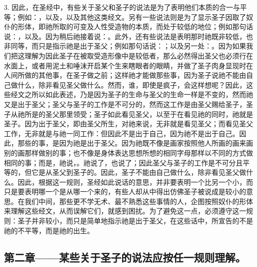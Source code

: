 3. 因此，在圣经中，有些关于圣父和圣子的说法是为了表明他们本质的合一与平等；例如：，以及，以及其他这类经文。另有一些说法则是为了显示圣子因取了奴仆的形体，即祂所取的可变及人性受造物的本质，而处于较低的地位；例如那句话说：，以及。因为稍后祂接着说：。此外，还有些说法是表明那时祂既非较低，也非同等，而只是指示祂是出于圣父；例如那句话说：；以及另一处：。因为如果我们把这理解为因此圣子在被取受造形像中是较低者，那么必然得出圣父也必须行在水面上，或者用泥土和唾沫开启某个生来瞎眼者的眼睛，并做了圣子肉身显现时在人间所做的其他事，在圣子做之前；这样祂才能做那些事，因为圣子说祂不能由自己做什么，除非看见圣父做什么。然而，谁，即使是疯子，会这样想呢？因此，这些经文之所以如此表述，乃是因为圣子的生命与圣父的生命一样是不变的，然而祂又是出于圣父；圣父与圣子的工作是不可分的，然而这工作是由圣父赐给圣子，圣子从祂所是的圣父那里领受；圣子如此看见圣父，以至于在看见祂的同时，祂就是圣子。因为出于圣父，即由圣父所生，对祂来说，无非就是看见圣父；而看见圣父工作，无非就是与祂一同工作：但因此不是出于自己，因为祂不是出于自己。因此，那些的事，是因为祂是出于圣父。因为祂既不像是画家按照他人所画的画来画别的画那样做别的事；也不像是身体表达思想所想的相同字母那样以不同的方式做相同的事；而是，祂说，。祂说了，也说了；因此圣父与圣子的工作是不可分且平等的，但它是从圣父到圣子的。因此，圣子不能由自己做什么，除非看见圣父做什么。因此，根据这一规则，圣经如此说话的意思，并非要表明一个比另一个小，而只是要表明哪一个是从哪一个来的，有些人却从中得出仿佛圣子被说成是较小的意思。在我们中间，那些更不学无术、最不熟悉这些事情的人，企图按照奴仆的形体来理解这些经文，从而误解它们，就感到困扰。为了避免这一点，必须遵守这一规则：圣子并非较小，而只是简单地指示祂是出于圣父，在这些话中，所宣告的不是祂的不平等，而是祂的出生。\par


\subsection{第二章——某些关于圣子的说法应按任一规则理解。}

